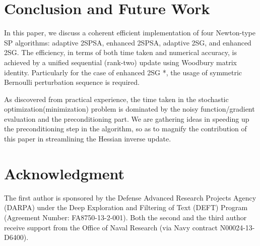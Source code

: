 \documentclass[conference]{IEEEtran}
\begin{document}
\section{Conclusion and Future Work} In this paper, we discuss
a coherent efficient implementation of four Newton-type SP algorithms:
adaptive 2SPSA, enhanced 2SPSA, adaptive 2SG, and enhanced 2SG. The
efficiency, in terms of both time taken and numerical accuracy, is
achieved by a unified sequential (rank-two) update using Woodbury
matrix identity. Particularly for the case of enhanced 2SG *, the
usage of symmetric Bernoulli perturbation sequence is required.

As discovered from practical experience, the time taken in the
stochastic optimization(minimization) problem is dominated by the
noisy function/gradient evaluation and the preconditioning part. We
are gathering ideas in speeding up the preconditioning step in the
algorithm, so as to magnify the contribution of this paper in
streamlining the Hessian inverse update.

\section*{Acknowledgment} The first author is sponsored by the
Defense Advanced Research Projects Agency (DARPA) under the Deep
Exploration and Filtering of Text (DEFT) Program (Agreement Number:
FA8750-13-2-001). Both the second and the third author receive
support from the Office of Naval Research (via Navy contract
N00024-13-D6400).
\end{document}
